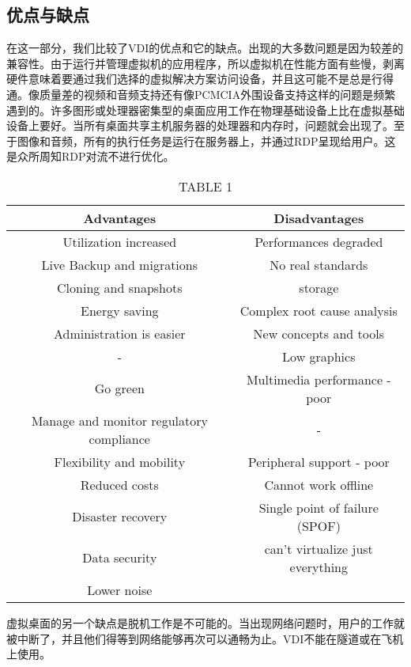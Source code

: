 \documentclass[10pt,a4paper]{article}
\begin{document}
\begin{CJK*}{UTF8}{gkai}
\subsection{优点与缺点}
在这一部分，我们比较了VDI的优点和它的缺点。出现的大多数问题是因为较差的兼容性。由于运行并管理虚拟机的应用程序，所以虚拟机在性能方面有些慢，剥离硬件意味着要通过我们选择的虚拟解决方案访问设备，并且这可能不是总是行得通。像质量差的视频和音频支持还有像PCMCIA外围设备支持这样的问题是频繁遇到的。许多图形或处理器密集型的桌面应用工作在物理基础设备上比在虚拟基础设备上要好。当所有桌面共享主机服务器的处理器和内存时，问题就会出现了。至于图像和音频，所有的执行任务是运行在服务器上，并通过RDP呈现给用户。这是众所周知RDP对流不进行优化。 


\begin{table}[!hbp]%
\begin{tabular}{c c}%
\hline %
\textbf{Advantages} 			& 			\textbf{Disadvantages}				\\
\hline
Utilization increased  		&  			Performances degraded 				\\
Live Backup and migrations  	&			No real standards					\\
Cloning and snapshots  		&			storage								\\
Energy saving   				&			Complex root cause analysis			\\
Administration is easier  	&			New concepts and tools				\\
-  							&			Low graphics							\\
Go green						&			Multimedia performance - poor		\\
Manage and monitor regulatory compliance		&		-						\\
Flexibility and mobility		&			Peripheral support - poor			\\
Reduced costs				&			Cannot work offline					\\
Disaster recovery			&			Single point of failure (SPOF)		\\
Data security				&			can’t virtualize just everything		\\
Lower noise					&												\\
\hline
\end{tabular}
\caption{TABLE 1} %
\end{table}


虚拟桌面的另一个缺点是脱机工作是不可能的。当出现网络问题时，用户的工作就被中断了，并且他们得等到网络能够再次可以通畅为止。VDI不能在隧道或在飞机上使用。 



\end{CJK*}
\end{document}
